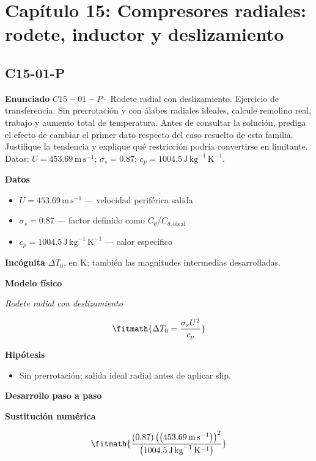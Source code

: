 \documentclass[10pt,openany]{book}
\begin{document}
\section{Capítulo 15: Compresores radiales: rodete, inductor y deslizamiento}
\subsection*{C15-01-P}

\noindent\textbf{Enunciado}
\(C15-01-P \cdot\) Rodete radial con deslizamiento. Ejercicio de transferencia. Sin prerrotación y con álabes radiales ideales, calcule remolino real, trabajo y aumento total de temperatura. Antes de consultar la solución, prediga el efecto de cambiar el primer dato respecto del caso resuelto de esta familia. Justifique la tendencia y explique qué restricción podría convertirse en limitante. Datos: \(U=453.69\, \mathrm{m}\,\mathrm{s}^{-1}\); \(\sigma_s=0.87\); \(c_p=1004.5\, \mathrm{J}\,\mathrm{kg}^{-1}\,\mathrm{K}^{-1}\).

\noindent\textbf{Datos}
\begin{itemize}
\item $U = 453.69\,\mathrm{m}\,\mathrm{s}^{-1}$ — velocidad periférica salida
\item $\sigma_s = 0.87$ — factor definido como $C_\theta/C_{\theta,\mathrm{ideal}}$
\item $c_p = 1004.5\,\mathrm{J}\,\mathrm{kg}^{-1}\,\mathrm{K}^{-1}$ — calor específico
\end{itemize}

\noindent\textbf{Incógnita}
$\Delta T_0$, en $\mathrm{K}$; también las magnitudes intermedias desarrolladas.

\noindent\textbf{Modelo físico}

\noindent\textit{Rodete radial con deslizamiento}

\[
\fitmath{\Delta T_0=\frac{\sigma_s U^{2}}{c_p}}
\]

\noindent\textbf{Hipótesis}
\begin{itemize}
\item Sin prerrotación; salida ideal radial antes de aplicar slip.
\end{itemize}

\noindent\textbf{Desarrollo paso a paso}



\noindent\textbf{Sustitución numérica}

\[
\fitmath{\frac{\left(0.87\right) \left(\left(453.69\,\mathrm{m}\,\mathrm{s}^{-1}\right)\right)^{2}}{\left(1004.5\,\mathrm{J}\,\mathrm{kg}^{-1}\,\mathrm{K}^{-1}\right)}}
\]
\end{document}
